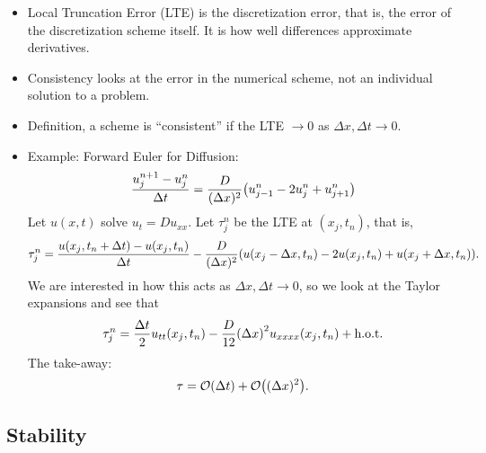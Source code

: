 \documentclass{article}
\newcommand{\Dx}{\Delta x}
\newcommand{\Dt}{\Delta t}
\newcommand{\hot}{\text{h.o.t.}}
\newcommand{\centdiff}{\frac{u_j^{n+1} - u_j^n}{\Dt}}
\begin{document}
            \begin{itemize}
                \item Local Truncation Error (LTE) is the discretization error, that is, the error of the discretization scheme itself.  It is how well differences approximate derivatives.
                \item Consistency looks at the error in the numerical scheme, not an individual solution to a problem.
                \item Definition, a scheme is ``consistent'' if the LTE $\rightarrow 0$ as $\Dx,\Dt \rightarrow 0$.
                \item Example: Forward Euler for Diffusion:
                \begin{align*}
                    \centdiff = \frac{D}{(\Dx)^2}\qty(u_{j-1}^n - 2u_j^n + u_{j+1}^n)
                \end{align*}
                Let $u(x,t)$ solve $u_t = Du_{xx}$.  Let $\tau_j^n$ be the LTE at $(x_j,t_n)$, that is,
                \begin{align}
                    \tau_j^n = \frac{u(x_j,t_n + \Dt) - u(x_j,t_n)}{\Dt} - \frac{D}{(\Dx)^2}\qty(u(x_j-\Dx,t_n) - 2u(x_j,t_n) + u(x_j+\Dx,t_n)).
                \end{align}
                We are interested in how this acts as $\Dx,\Dt \rightarrow 0$, so we look at the Taylor expansions and see that
                \begin{align}
                    \tau_j^n = \frac{\Dt}{2}u_{tt}(x_j,t_n) - \frac{D}{12}\qty(\Dx)^2u_{xxxx}(x_j,t_n) + \hot
                \end{align}
                The take-away:
                \begin{align}
                    \tau = \order{\Dt} + \order{(\Dx)^2}.
                \end{align}
            \end{itemize}

        \subsection{Stability}
\end{document}
